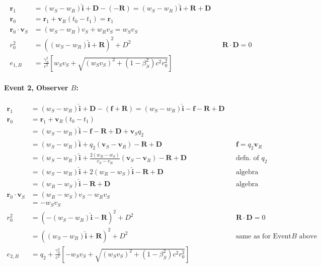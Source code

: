 \documentclass[a4paper]{article}
\theoremstyle{plain}
\theoremstyle{definition}
\newcommand{\vect}[1]{\mathbf{#1}}
\newcommand{\hatvec}[1]{\hat{\mathbf{#1}}}
\begin{document}
\begin{align*}
\vect{r}_1 & = (w_S - w_R)\hatvec{i} + \vect{D} - (-\vect{R}) = (w_S - w_R)\hatvec{i} + \vect{R} + \vect{D} \\
\vect{r}_0 & = \vect{r}_1 + \vect{v}_R (t_0 - t_1) = \vect{r}_1 \\
\vect{r}_0 \cdot \vect{v}_S & = (w_S - w_R)v_S + w_Rv_S = w_Sv_S \\
r_0^2 & = ((w_S-w_R)\hatvec{i} + \vect{R})^2 + D^2 & & \text{$\vect{R} \cdot \vect{D} = 0$} \\
e_{1,B} & = \frac{\gamma_S^2}{c^2} \left[ w_Sv_S + \sqrt{ (w_Sv_S)^2 + (1-\beta_S^2)c^2r_0^2 } \right]
\end{align*}


\paragraph{Event 2, Observer $B$:}

\begin{align*}
\vect{r}_1 & = (w_S - w_R)\hatvec{i} + \vect{D} - (\vect{f} + \vect{R}) = (w_S - w_R)\hatvec{i} - \vect{f} - \vect{R} + \vect{D} \\
\vect{r}_0
  & = \vect{r}_1 + \vect{v}_R (t_0 - t_1) \\
  & = (w_S - w_R)\hatvec{i} - \vect{f} - \vect{R} + \vect{D} + \vect{v}_S q_2 \\
  & = (w_S - w_R)\hatvec{i} + q_2 (\vect{v}_S - \vect{v}_R) - \vect{R} + \vect{D} & & \text{$\vect{f} = q_2 \vect{v}_R$} \\
  & = (w_S - w_R)\hatvec{i} + \frac{2(w_R - w_S)}{v_S - v_R} (\vect{v}_S - \vect{v}_R) - \vect{R} + \vect{D} & & \text{defn. of $q_2$} \\
  & = (w_S - w_R)\hatvec{i} + 2(w_R - w_S) \hatvec{i} - \vect{R} + \vect{D} & & \text{algebra} \\
  & = (w_R - w_S) \hatvec{i} - \vect{R} + \vect{D} & & \text{algebra} \\
\vect{r}_0 \cdot \vect{v}_S
  & = (w_R - w_S)v_S - w_Rv_S \\
  & = - w_Sv_S \\
r_0^2
  & = (-(w_S-w_R)\hatvec{i} - \vect{R})^2 + D^2 & & \text{$\vect{R} \cdot \vect{D} = 0$} \\
  & = ((w_S-w_R)\hatvec{i} + \vect{R})^2 + D^2 & & \text{same as for Event 1, Observer $B$ above} \\
e_{2,B} & = q_2 + \frac{\gamma_S^2}{c^2} \left[ -w_Sv_S + \sqrt{ (w_Sv_S)^2 + (1-\beta_S^2)c^2r_0^2 } \right]
\end{align*}
\end{document}
